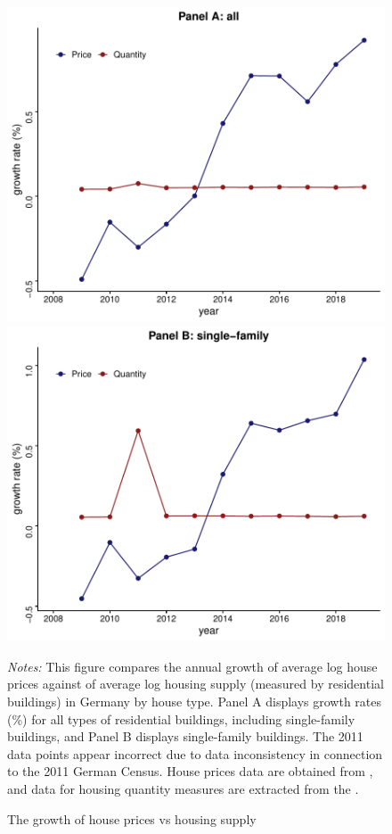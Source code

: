 \documentclass[
  12pt,
]{article}
\begin{document}
\begin{figure}[H]
\centering

\begin{center}\includegraphics[width=0.49\linewidth]{output/figs/price-quantity-growth-1} \includegraphics[width=0.49\linewidth]{output/figs/price-quantity-growth-2} \end{center}

\caption{The growth of house prices vs housing supply}\label{fig:price-quantity-growth}
\medskip
\begin{minipage}{0.9\textwidth}
\footnotesize
\textit{Notes:} This figure compares the annual growth of average log house prices against of average log housing supply (measured by residential buildings) in Germany by house type. Panel A displays growth rates (\%) for all types of residential buildings, including single-family buildings, and Panel B displays single-family buildings. The 2011 data points appear incorrect due to data inconsistency in connection to the 2011 German Census. House prices data are obtained from \citet{rwi2020}, and data for housing quantity measures are extracted from the \citet{atlasde2022}.
\end{minipage}
\end{figure}
\end{document}
